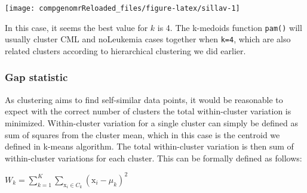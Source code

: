\documentclass[12pt,]{krantz}
\newenvironment{Shaded}{\begin{snugshade}}{\end{snugshade}}
\newcommand{\ControlFlowTok}[1]{\textcolor[rgb]{0.13,0.29,0.53}{\textbf{#1}}}
\newcommand{\DataTypeTok}[1]{\textcolor[rgb]{0.13,0.29,0.53}{#1}}
\newcommand{\DecValTok}[1]{\textcolor[rgb]{0.00,0.00,0.81}{#1}}
\newcommand{\KeywordTok}[1]{\textcolor[rgb]{0.13,0.29,0.53}{\textbf{#1}}}
\newcommand{\NormalTok}[1]{#1}
\newcommand{\OperatorTok}[1]{\textcolor[rgb]{0.81,0.36,0.00}{\textbf{#1}}}
\newcommand{\StringTok}[1]{\textcolor[rgb]{0.31,0.60,0.02}{#1}}
\theoremstyle{definition}
\theoremstyle{definition}
\theoremstyle{definition}
\theoremstyle{remark}
\begin{document}
\begin{Shaded}
\end{Shaded}

\begin{center}\texttt{[image: compgenomrReloaded\_files/figure-latex/sillav-1]} \end{center}

In this case, it seems the best value for \(k\) is 4. The k-medoids
function \texttt{pam()} will usually cluster CML and noLeukemia cases
together when \texttt{k=4}, which are also related clusters according to
hierarchical clustering we did earlier.

\hypertarget{gap-statistic}{%
\subsubsection{Gap statistic}\label{gap-statistic}}

As clustering aims to find self-similar data points, it would be
reasonable to expect with the correct number of clusters the total
within-cluster variation is minimized. Within-cluster variation for a
single cluster can simply be defined as sum of squares from the cluster
mean, which in this case is the centroid we defined in k-means
algorithm. The total within-cluster variation is then sum of
within-cluster variations for each cluster. This can be formally defined
as follows:

\(\displaystyle W_k = \sum_{k=1}^K \sum_{\mathrm{x}_i \in C_k} (\mathrm{x}_i - \mu_k )^2\)
\end{document}
